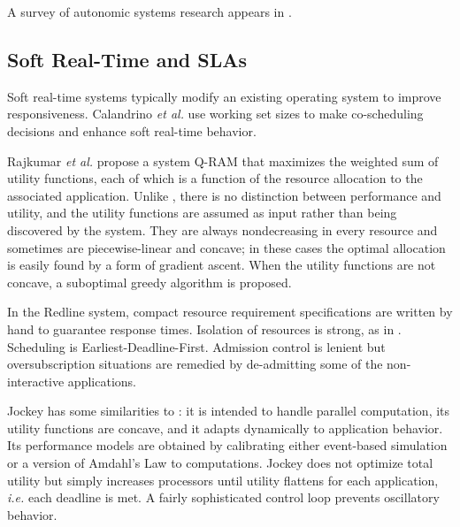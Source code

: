 A survey of autonomic systems research appears in \cite{1380585}.

\subsection{Soft Real-Time and SLAs}
Soft real-time systems typically modify an existing operating system to improve responsiveness.
Calandrino \emph{et al.}\cite{unc} use working set sizes to make co-scheduling decisions and enhance soft real-time behavior.

%
Rajkumar \emph{et al.}\cite{828990} propose a system Q-RAM that maximizes the weighted sum of utility functions,
each of which is a function of the resource allocation to the associated application.
Unlike \pacora, there is no distinction between performance and utility, and
the utility functions are assumed as input rather than being discovered by the system.
They are always nondecreasing in every resource and sometimes are piecewise-linear and concave;
in these cases the optimal allocation is easily found by a form of gradient ascent.
When the utility functions are not concave, a suboptimal greedy algorithm is proposed.

%
In the Redline system\cite{Redline}, compact resource requirement specifications are written by hand to guarantee response times.
Isolation of resources is strong, as in \pacora.  Scheduling is Earliest-Deadline-First.
Admission control is lenient but oversubscription situations are remedied by de-admitting some of the non-interactive applications.

%
Jockey\cite{Jockey} has some similarities to \pacora: it is intended to handle parallel computation, its utility functions are concave,
and it adapts dynamically to application behavior.
Its performance models are obtained by calibrating either event-based simulation or a version of Amdahl's Law to computations.
Jockey does not optimize total utility but simply increases processors until utility flattens for each application,
\emph{i.e.} each deadline is met.
A fairly sophisticated control loop prevents oscillatory behavior.

